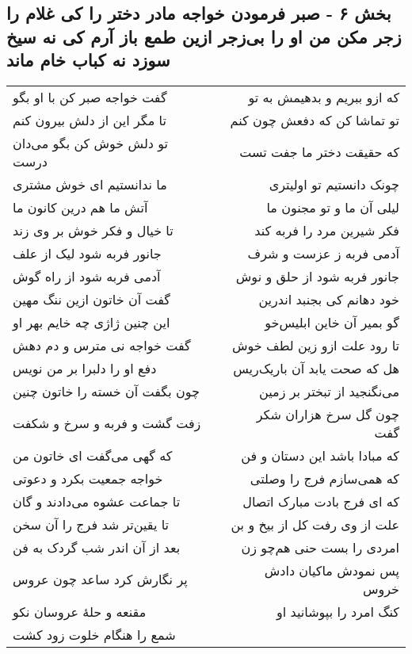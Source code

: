 \begin{center}
\section*{بخش ۶ - صبر فرمودن خواجه مادر دختر را کی غلام را زجر مکن من او را بی‌زجر ازین طمع باز آرم کی نه سیخ سوزد نه کباب خام ماند}
\label{sec:sh006}
\begin{longtable}{l p{0.5cm} r}
گفت خواجه صبر کن با او بگو
&&
که ازو ببریم و بدهیمش به تو
\\
تا مگر این از دلش بیرون کنم
&&
تو تماشا کن که دفعش چون کنم
\\
تو دلش خوش کن بگو می‌دان درست
&&
که حقیقت دختر ما جفت تست
\\
ما ندانستیم ای خوش مشتری
&&
چونک دانستیم تو اولیتری
\\
آتش ما هم درین کانون ما
&&
لیلی آن ما و تو مجنون ما
\\
تا خیال و فکر خوش بر وی زند
&&
فکر شیرین مرد را فربه کند
\\
جانور فربه شود لیک از علف
&&
آدمی فربه ز عزست و شرف
\\
آدمی فربه شود از راه گوش
&&
جانور فربه شود از حلق و نوش
\\
گفت آن خاتون ازین ننگ مهین
&&
خود دهانم کی بجنبد اندرین
\\
این چنین ژاژی چه خایم بهر او
&&
گو بمیر آن خاین ابلیس‌خو
\\
گفت خواجه نی مترس و دم دهش
&&
تا رود علت ازو زین لطف خوش
\\
دفع او را دلبرا بر من نویس
&&
هل که صحت یابد آن باریک‌ریس
\\
چون بگفت آن خسته را خاتون چنین
&&
می‌نگنجید از تبختر بر زمین
\\
زفت گشت و فربه و سرخ و شکفت
&&
چون گل سرخ هزاران شکر گفت
\\
که گهی می‌گفت ای خاتون من
&&
که مبادا باشد این دستان و فن
\\
خواجه جمعیت بکرد و دعوتی
&&
که همی‌سازم فرج را وصلتی
\\
تا جماعت عشوه می‌دادند و گان
&&
که ای فرج بادت مبارک اتصال
\\
تا یقین‌تر شد فرج را آن سخن
&&
علت از وی رفت کل از بیخ و بن
\\
بعد از آن اندر شب گردک به فن
&&
امردی را بست حنی هم‌چو زن
\\
پر نگارش کرد ساعد چون عروس
&&
پس نمودش ماکیان دادش خروس
\\
مقنعه و حلهٔ عروسان نکو
&&
کنگ امرد را بپوشانید او
\\
شمع را هنگام خلوت زود کشت

\end{longtable}
\end{center}
